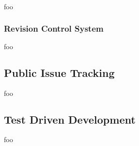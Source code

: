 foo


\subsubsection{Revision Control System}

foo


\subsection{Public Issue Tracking}



foo


\subsection{Test Driven Development}

foo

